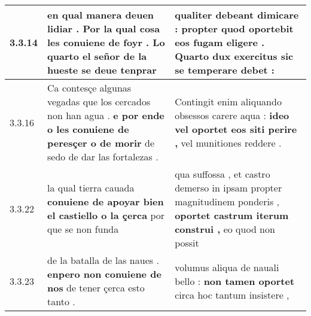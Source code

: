 \begin{tabular}{|p{1cm}|p{6.5cm}|p{6.5cm}|}
3.3.14 & en qual manera deuen lidiar . \textbf{ Por la qual cosa les conuiene de foyr . } Lo quarto el señor de la hueste se deue tenprar & qualiter debeant dimicare : \textbf{ propter quod oportebit eos fugam eligere . } Quarto dux exercitus sic se temperare debet : \\\hline
3.3.16 & Ca contesçe algunas vegadas que los cercados non han agua . \textbf{ e por ende o les conuiene de peresçer o de morir } de sedo de dar las fortalezas . & Contingit enim aliquando obsessos carere aqua : \textbf{ ideo vel oportet eos siti perire , } vel munitiones reddere . \\\hline
3.3.22 & la qual tierra cauada \textbf{ conuiene de apoyar bien el castiello o la çerca } por que se non funda & qua suffossa , et castro demerso in ipsam propter magnitudinem ponderis , \textbf{ oportet castrum iterum construi , } eo quod non possit \\\hline
3.3.23 & de la batalla de las naues . \textbf{ enpero non conuiene de nos } de tener çerca esto tanto . & volumus aliqua de nauali bello : \textbf{ non tamen oportet } circa hoc tantum insistere , \\\hline

\end{tabular}
